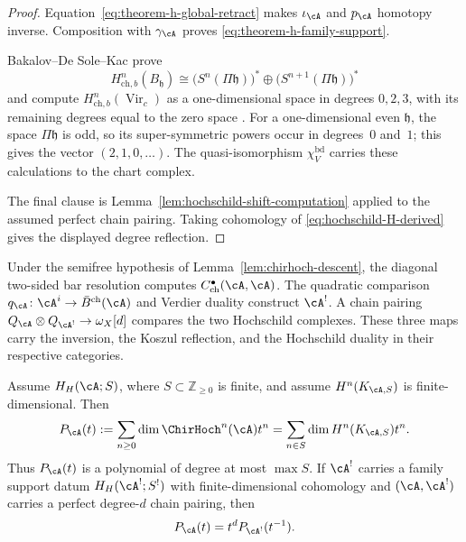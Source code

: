 \begin{proof}
Equation~\eqref{eq:theorem-h-global-retract} makes
\(\iota_\cA\) and \(p_\cA\) homotopy inverse.  Composition with
\(\gamma_\cA\) proves \eqref{eq:theorem-h-family-support}.

Bakalov--De Sole--Kac prove
\[
 H^n_{\mathrm{ch},b}(B_{\mathfrak h})
 \cong
 \bigl(S^n(\Pi\mathfrak h)\bigr)^*
 \oplus
 \bigl(S^{n+1}(\Pi\mathfrak h)\bigr)^*
\]
and compute \(H^n_{\mathrm{ch},b}(\operatorname{Vir}_c)\) as a
one-dimensional space in degrees \(0,2,3\), with its remaining
degrees equal to the zero space
\cite[Theorems~7.4 and~7.2]{BDSK21}.  For a one-dimensional even
\(\mathfrak h\), the space \(\Pi\mathfrak h\) is odd, so its
super-symmetric powers occur in degrees~\(0\) and~\(1\); this gives
the vector \((2,1,0,\ldots)\).  The quasi-isomorphism
\(\chi_V^{\mathrm{bd}}\) carries these calculations to the chart
complex.

The final clause is Lemma~\ref{lem:hochschild-shift-computation}
applied to the assumed perfect chain pairing.  Taking cohomology of
\eqref{eq:hochschild-H-derived} gives the displayed degree reflection.
\end{proof}

\begin{remark}
Under the semifree hypothesis of
Lemma~\ref{lem:chirhoch-descent}, the diagonal two-sided bar resolution
computes \(C^\bullet_{\mathrm{ch}}(\cA,\cA)\).  The quadratic comparison
\(q_\cA\colon\cA^i\to\bar B^{\mathrm{ch}}(\cA)\) and Verdier duality
construct \(\cA^!\).  A chain pairing
\(Q_\cA\otimes Q_{\cA^!}\to\omega_X[d]\) compares the two
Hochschild complexes.  These three maps carry the inversion, the
Koszul reflection, and the Hochschild duality in their respective
categories.
\end{remark}

\begin{theorem}
\label{thm:hochschild-polynomial-growth}
Assume \(H_H(\cA;S)\), where
\(S\subset\mathbb Z_{\geq0}\) is finite, and assume
\(H^n(K_{\cA,S})\) is finite-dimensional.  Then
\begin{equation}\label{eq:hoch-hilbert-polynomial}
 P_\cA(t)
 :=\sum_{n\geq0}\dim\ChirHoch^n(\cA)t^n
 =\sum_{n\in S}\dim H^n(K_{\cA,S})t^n.
\end{equation}
Thus \(P_\cA(t)\) is a polynomial of degree at most \(\max S\).
If \(\cA^!\) carries a family support datum
\(H_H(\cA^!;S^!)\) with finite-dimensional cohomology and
\((\cA,\cA^!)\) carries a perfect degree-\(d\) chain pairing, then
\[
 P_\cA(t)=t^dP_{\cA^!}(t^{-1}).
\]
\end{theorem}

